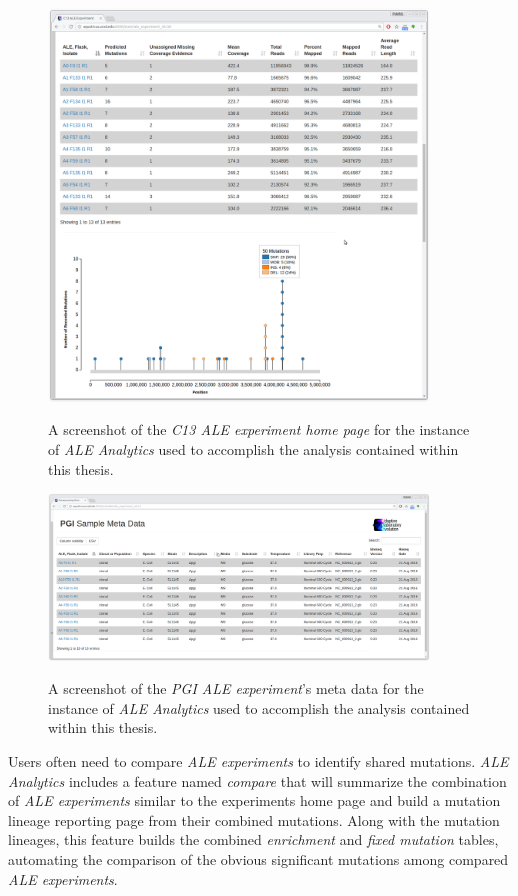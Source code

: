 \documentclass[12pt,final,masters,chapterheads]{ucsd}  %
\begin{document}
\begin{figure}[H]
  \caption{A screenshot of the \textit{C13 ALE experiment home page} for the instance of \textit{ALE Analytics} used to accomplish the analysis contained within this thesis.}
  \centering
  \includegraphics[width=0.9\textwidth]{experiment_stats_page.png}
  \label{fig:experiment_stats_page}
\end{figure}
\begin{figure}[H]
  \caption{A screenshot of the \textit{PGI ALE experiment}'s meta data for the instance of \textit{ALE Analytics} used to accomplish the analysis contained within this thesis.}
  \centering
  \includegraphics[width=0.9\textwidth]{metadata_page.png}
  \label{fig:metadata_page}
\end{figure}
Users often need to compare \textit{ALE experiments} to identify shared mutations. \textit{ALE Analytics} includes a feature named \textit{compare} that will summarize the combination of \textit{ALE experiments} similar to the experiments home page and build a mutation lineage reporting page from their combined mutations. Along with the mutation lineages, this feature builds the combined \textit{enrichment} and \textit{fixed mutation} tables, automating the comparison of the obvious significant mutations among compared \textit{ALE experiments}.
\end{document}
